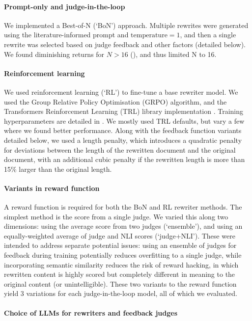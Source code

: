 \documentclass{article}
\begin{document}
\paragraph{Prompt-only and judge-in-the-loop} We implemented a Best-of-N (`BoN') approach. Multiple rewrites were generated using the literature-informed prompt and $\text{temperature} = 1$, and then a single rewrite was selected based on judge feedback and other factors (detailed below). We found diminishing returns for $N>16$ (), and thus limited N to 16.

\paragraph{Reinforcement learning} We used reinforcement learning (`RL') to fine-tune a base rewriter model. We used the Group Relative Policy Optimisation (GRPO) algorithm, and the Transformers Reinforcement Learning (TRL) library implementation \citep{TRLTransformersReinforcement}. Training hyperparameters are detailed in . We mostly used TRL defaults, but vary a few where we found better performance. Along with the feedback function variants detailed below, we used a length penalty, which introduces a quadratic penalty for deviations between the length of the rewritten document and the original document, with an additional cubic penalty if the rewritten length is more than 15\% larger than the original length. 

\paragraph{Variants in reward function}

A reward function is required for both the BoN and RL rewriter methods. The simplest method is the score from a single judge. We varied this along two dimensions: using the average score from two judges (`ensemble'), and using an equally-weighted average of judge and NLI scores (`judge+NLI'). These were intended to address separate potential issues: using an ensemble of judges for feedback during training potentially reduces overfitting to a single judge, while incorporating semantic similarity reduces the risk of reward hacking, in which rewritten content is highly scored but completely different in meaning to the original content (or unintelligible). These two variants to the reward function yield 3 variations for each judge-in-the-loop model, all of which we evaluated.

\paragraph{Choice of LLMs for rewriters and feedback judges}
\end{document}
